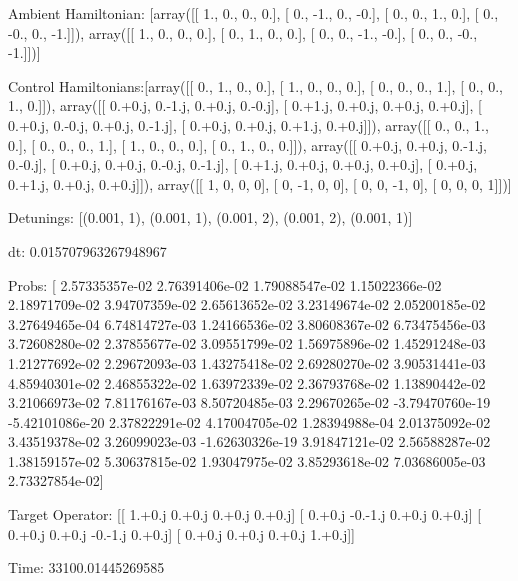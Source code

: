 \documentclass{article}
\begin{document}
    

\newpage

Ambient Hamiltonian: [array([[ 1.,  0.,  0.,  0.],
       [ 0., -1.,  0., -0.],
       [ 0.,  0.,  1.,  0.],
       [ 0., -0.,  0., -1.]]), array([[ 1.,  0.,  0.,  0.],
       [ 0.,  1.,  0.,  0.],
       [ 0.,  0., -1., -0.],
       [ 0.,  0., -0., -1.]])]

Control Hamiltonians:[array([[ 0.,  1.,  0.,  0.],
       [ 1.,  0.,  0.,  0.],
       [ 0.,  0.,  0.,  1.],
       [ 0.,  0.,  1.,  0.]]), array([[ 0.+0.j,  0.-1.j,  0.+0.j,  0.-0.j],
       [ 0.+1.j,  0.+0.j,  0.+0.j,  0.+0.j],
       [ 0.+0.j,  0.-0.j,  0.+0.j,  0.-1.j],
       [ 0.+0.j,  0.+0.j,  0.+1.j,  0.+0.j]]), array([[ 0.,  0.,  1.,  0.],
       [ 0.,  0.,  0.,  1.],
       [ 1.,  0.,  0.,  0.],
       [ 0.,  1.,  0.,  0.]]), array([[ 0.+0.j,  0.+0.j,  0.-1.j,  0.-0.j],
       [ 0.+0.j,  0.+0.j,  0.-0.j,  0.-1.j],
       [ 0.+1.j,  0.+0.j,  0.+0.j,  0.+0.j],
       [ 0.+0.j,  0.+1.j,  0.+0.j,  0.+0.j]]), array([[ 1,  0,  0,  0],
       [ 0, -1,  0,  0],
       [ 0,  0, -1,  0],
       [ 0,  0,  0,  1]])]

Detunings: [(0.001, 1), (0.001, 1), (0.001, 2), (0.001, 2), (0.001, 1)]

 dt: 0.015707963267948967

Probs: [  2.57335357e-02   2.76391406e-02   1.79088547e-02   1.15022366e-02
   2.18971709e-02   3.94707359e-02   2.65613652e-02   3.23149674e-02
   2.05200185e-02   3.27649465e-04   6.74814727e-03   1.24166536e-02
   3.80608367e-02   6.73475456e-03   3.72608280e-02   2.37855677e-02
   3.09551799e-02   1.56975896e-02   1.45291248e-03   1.21277692e-02
   2.29672093e-03   1.43275418e-02   2.69280270e-02   3.90531441e-03
   4.85940301e-02   2.46855322e-02   1.63972339e-02   2.36793768e-02
   1.13890442e-02   3.21066973e-02   7.81176167e-03   8.50720485e-03
   2.29670265e-02  -3.79470760e-19  -5.42101086e-20   2.37822291e-02
   4.17004705e-02   1.28394988e-04   2.01375092e-02   3.43519378e-02
   3.26099023e-03  -1.62630326e-19   3.91847121e-02   2.56588287e-02
   1.38159157e-02   5.30637815e-02   1.93047975e-02   3.85293618e-02
   7.03686005e-03   2.73327854e-02]

Target Operator: [[ 1.+0.j  0.+0.j  0.+0.j  0.+0.j]
 [ 0.+0.j -0.-1.j  0.+0.j  0.+0.j]
 [ 0.+0.j  0.+0.j -0.-1.j  0.+0.j]
 [ 0.+0.j  0.+0.j  0.+0.j  1.+0.j]]

Time: 33100.01445269585
\end{document}
